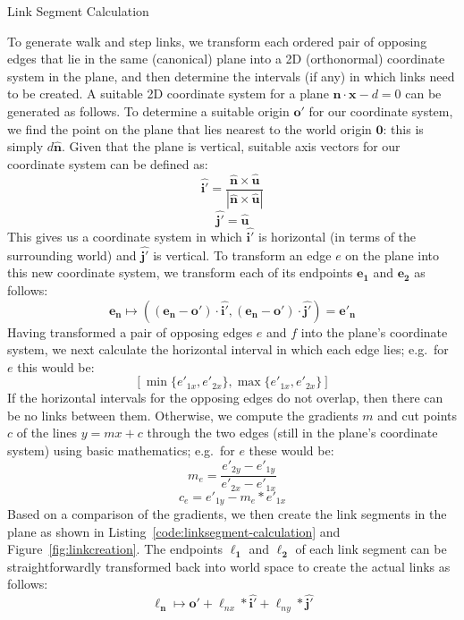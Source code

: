 \documentclass[10pt,twocolumn]{article}
\begin{document}
\begin{stulisting}[!t]
\caption{Link Segment Calculation}
\label{code:linksegment-calculation}

\end{stulisting}
\fi

To generate walk and step links, we transform each ordered pair\footnotemark{} of opposing edges that lie in the same (canonical) plane into a 2D (orthonormal) coordinate system in the plane, and then determine the intervals (if any) in which links need to be created. A suitable 2D coordinate system for a plane $\mathbf{\hat{n}} \cdot \mathbf{x} - d = 0$ can be generated as follows. To determine a suitable origin $\mathbf{o'}$ for our coordinate system, we find the point on the plane that lies nearest to the world origin $\mathbf{0}$: this is simply $d\mathbf{\hat{n}}$. Given that the plane is vertical, suitable axis vectors for our coordinate system can be defined as:
%
\[
\mathbf{\hat{i'}} = \frac{\mathbf{\hat{n}} \times \mathbf{\hat{u}}}{\left| \mathbf{\hat{n}} \times \mathbf{\hat{u}} \right|}
\]
\[
\mathbf{\hat{j'}} = \mathbf{\hat{u}}
\]
%
This gives us a coordinate system in which $\mathbf{\hat{i'}}$ is horizontal (in terms of the surrounding world) and $\mathbf{\hat{j'}}$ is vertical. To transform an edge $e$ on the plane into this new coordinate system, we transform each of its endpoints $\mathbf{e_1}$ and $\mathbf{e_2}$ as follows:
%
\[
\mathbf{e_n} \mapsto ((\mathbf{e_n} - \mathbf{o'}) \cdot \mathbf{\hat{i'}}, (\mathbf{e_n} - \mathbf{o'}) \cdot \mathbf{\hat{j'}}) = \mathbf{e'_n}
\]
%
Having transformed a pair of opposing edges $e$ and $f$ into the plane's coordinate system, we next calculate the horizontal interval in which each edge lies; e.g.~for $e$ this would be:
%
\[
\left[ \min\{e'_{1x},e'_{2x}\}, \max\{e'_{1x},e'_{2x}\} \right]
\]
%
If the horizontal intervals for the opposing edges do not overlap, then there can be no links between them. Otherwise, we compute the gradients $m$ and cut points $c$ of the lines $y = mx + c$ through the two edges (still in the plane's coordinate system) using basic mathematics; e.g.~for $e$ these would be:
%
\[
m_e = \frac{e'_{2y} - e'_{1y}}{e'_{2x} - e'_{1x}}
\]
\[
c_e = e'_{1y} - m_e * e'_{1x}
\]
%
Based on a comparison of the gradients, we then create the link segments in the plane as shown in Listing~\ref{code:linksegment-calculation} and Figure~\ref{fig:linkcreation}. The endpoints $\mathbf{\ell_1}$ and $\mathbf{\ell_2}$ of each link segment can be straightforwardly transformed back into world space to create the actual links as follows:
%
\[
\mathbf{\ell_n} \mapsto \mathbf{o'} + \ell_{nx} * \mathbf{\hat{i'}} + \ell_{ny} * \mathbf{\hat{j'}}
\]
\end{document}
